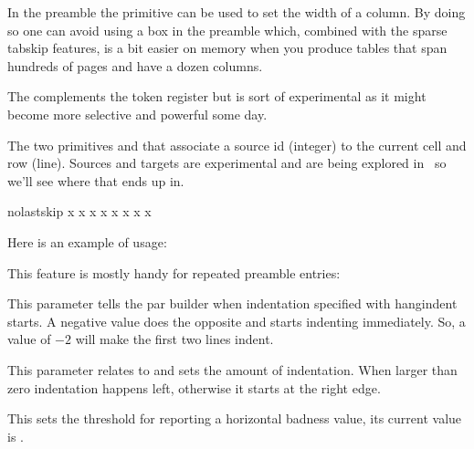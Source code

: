 In the preamble the  primitive can be used to set the width of a
column. By doing so one can avoid using a box in the preamble which, combined
with the sparse tabskip features, is a bit easier on memory when you produce
tables that span hundreds of pages and have a dozen columns.

The  complements the  token register but is sort of
experimental as it might become more selective and powerful some day.

The two primitives  and  that
associate a source id (integer) to the current cell and row (line). Sources and
targets are experimental and are being explored in \CONTEXT\ so we'll see where
that ends up in.

\startbuffer
{}

\halign nolastskip {
    \aligncontent \aligntab
    \aligncontent \aligntab \aligntab
    \aligncontent \cr
    x \aligntab x \aligntab x \aligntab x\cr
    x \aligntab x \aligntab x \aligntab x\cr
}
\stopbuffer

Here is an example of  usage:

\typebuffer[option=TEX]

This feature is mostly handy for repeated preamble entries:

{\showboxes \getbuffer}

\stopoldprimitive

\startoldprimitive[title={\prm {hangafter}}]

This parameter tells the par builder when indentation specified with \prm
{hangindent} starts. A negative value does the opposite and starts indenting
immediately. So, a value of $-2$ will make the first two lines indent.

\stopoldprimitive

\startoldprimitive[title={\prm {hangindent}}]

This parameter relates to  and sets the amount of indentation.
When larger than zero indentation happens left, otherwise it starts at the right
edge.

\stopoldprimitive

\startoldprimitive[title={\prm {hbadness}}]

This sets the threshold for reporting a horizontal badness value, its current
value is \the \badness.

